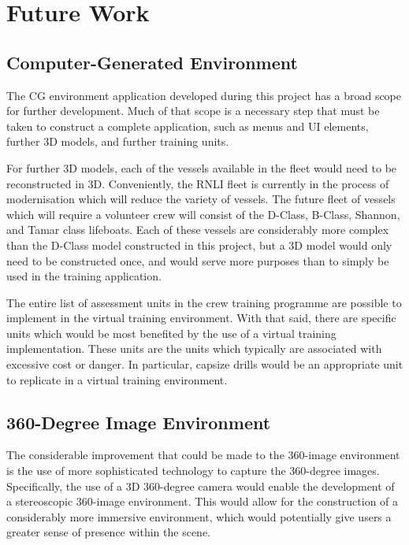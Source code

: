 \documentclass[ %
                    author={Elis Jones},
                supervisor={Dr. Kirsten Cater},
                    degree={BSc},
                     title={The Effect of Presentation Medium on Spatial Cognition},
                  subtitle={in the Virtual Environment},
                      year={2018} ]{dissertation}
\begin{document}
\section{Future Work}\label{further}
\subsection{Computer-Generated Environment}
The CG environment application developed during this project has a broad scope for further development. Much of that scope is a necessary step that must be taken to construct a complete application, such as menus and UI elements, further 3D models, and further training units. 

For further 3D models, each of the vessels available in the fleet would need to be reconstructed in 3D. Conveniently, the RNLI fleet is currently in the process of modernisation which will reduce the variety of vessels. The future fleet of vessels which will require a volunteer crew will consist of the D-Class, B-Class, Shannon, and Tamar class lifeboats. Each of these vessels are considerably more complex than the D-Class model constructed in this project, but a 3D model would only need to be constructed once, and would serve more purposes than to simply be used in the training application. 

The entire list of assessment units in the crew training programme are possible to implement in the virtual training environment. With that said, there are specific units which would be most benefited by the use of a virtual training implementation. These units are the units which typically are associated with excessive cost or danger. In particular, capsize drills would be an appropriate unit to replicate in a virtual training environment. 

\subsection{360-Degree Image Environment}
The considerable improvement that could be made to the 360-image environment is the use of more sophisticated technology to capture the 360-degree images. Specifically, the use of a 3D 360-degree camera would enable the development of a stereoscopic 360-image environment. This would allow for the construction of a considerably more immersive environment, which would potentially give users a greater sense of presence within the scene. 
\end{document}
